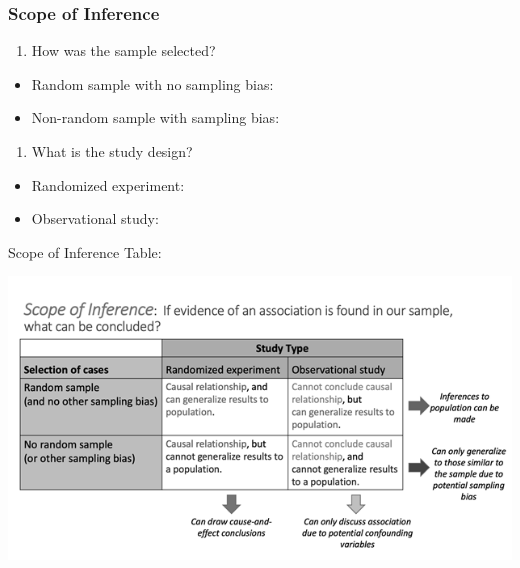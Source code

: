 \documentclass[
]{report}
\providecommand{\tightlist}{%
  \setlength{\itemsep}{0pt}\setlength{\parskip}{0pt}}
\begin{document}
\vspace{0.5in}

\subsubsection*{Scope of Inference}\label{scope-of-inference-1}

\begin{enumerate}
\def\labelenumi{\arabic{enumi}.}
\tightlist
\item
  How was the sample selected?
\end{enumerate}

\begin{itemize}
\tightlist
\item
  Random sample with no sampling bias:
\end{itemize}

\vspace{0.35in}

\begin{itemize}
\tightlist
\item
  Non-random sample with sampling bias:
\end{itemize}

\vspace{0.35in}

\begin{enumerate}
\def\labelenumi{\arabic{enumi}.}
\setcounter{enumi}{1}
\tightlist
\item
  What is the study design?
\end{enumerate}

\begin{itemize}
\tightlist
\item
  Randomized experiment:
\end{itemize}

\vspace{0.35in}

\begin{itemize}
\tightlist
\item
  Observational study:
\end{itemize}

\vspace{0.35in}

\newpage

Scope of Inference Table:

\begin{center}\includegraphics[width=0.65\linewidth]{images/ScopeOfInferenceGreyscale} \end{center}
\end{document}

